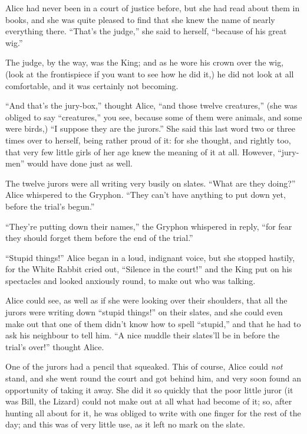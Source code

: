 \documentclass[book, 20pt]{extbook}
\begin{document}
Alice had never been in a court of justice before, but she had read
about them in books, and she was quite pleased to find that she knew the
name of nearly everything there. ``That's the judge,'' she said to
herself, ``because of his great wig.''

The judge, by the way, was the King; and as he wore his crown over the
wig, (look at the frontispiece if you want to see how he did it,) he did
not look at all comfortable, and it was certainly not becoming.

``And that's the jury-box,'' thought Alice, ``and those twelve
creatures,'' (she was obliged to say ``creatures,'' you see, because
some of them were animals, and some were birds,) ``I suppose they are
the jurors.'' She said this last word two or three times over to
herself, being rather proud of it: for she thought, and rightly too,
that very few little girls of her age knew the meaning of it at all.
However, ``jury-men'' would have done just as well.

The twelve jurors were all writing very busily on slates. ``What are
they doing?'' Alice whispered to the Gryphon. ``They can't have anything
to put down yet, before the trial's begun.''

``They're putting down their names,'' the Gryphon whispered in reply,
``for fear they should forget them before the end of the trial.''

``Stupid things!'' Alice began in a loud, indignant voice, but she
stopped hastily, for the White Rabbit cried out, ``Silence in the
court!'' and the King put on his spectacles and looked anxiously round,
to make out who was talking.

Alice could see, as well as if she were looking over their shoulders,
that all the jurors were writing down ``stupid things!'' on their
slates, and she could even make out that one of them didn't know how to
spell ``stupid,'' and that he had to ask his neighbour to tell him. ``A
nice muddle their slates'll be in before the trial's over!'' thought
Alice.

One of the jurors had a pencil that squeaked. This of course, Alice
could \emph{not} stand, and she went round the court and got behind him,
and very soon found an opportunity of taking it away. She did it so
quickly that the poor little juror (it was Bill, the Lizard) could not
make out at all what had become of it; so, after hunting all about for
it, he was obliged to write with one finger for the rest of the day; and
this was of very little use, as it left no mark on the slate.
\end{document}
